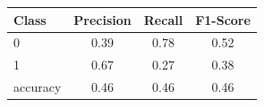 \begin{tabular}{lccc}
\textbf{Class} & Precision & Recall & F1-Score \\
\hline
0 & 0.39 & 0.78 & 0.52 \\
1 & 0.67 & 0.27 & 0.38 \\
accuracy & 0.46 & 0.46 & 0.46 \\
\end{tabular}